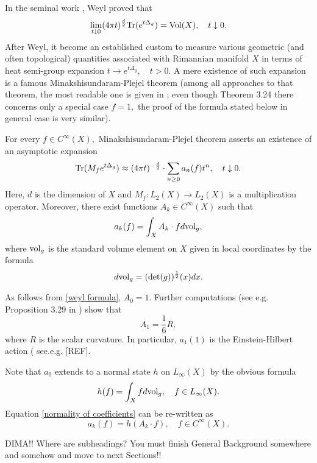 \documentclass{article}
\begin{document}
In the seminal work \cite{Weyl}, Weyl proved that
\begin{equation}\label{weyl formula}
\lim_{t\downarrow0}(4\pi t)^{\frac{d}{2}}{\rm Tr}(e^{t\Delta_g})={\rm Vol}(X),\quad t\downarrow0.
\end{equation}
After Weyl, it become an established custom to measure various geometric (and often topological) quantities associated with Rimannian manifold $X$ in terms of heat semi-group expansion $t\to e^{t\Delta_g},\quad t>0.$ A mere existence of such expansion is a famous Minakshisundaram-Plejel theorem (among all approaches to {\color{red} that} theorem, the most readable one is given in \cite{Rosenberg}; even though Theorem 3.24 there concerns only a special case $f=1,$ the proof of the formula stated below in general case is very similar). 

For every $f\in C^{\infty}(X),$ Minakshisundaram-Plejel theorem asserts an existence of an asymptotic expansion 
\begin{equation}\label{heat asymptotic}
{\rm Tr}(M_fe^{t\Delta_g})\approx (4\pi t)^{-\frac{d}{2}}\cdot \sum_{n\geq0}a_n(f)t^n,\quad t\downarrow0.
\end{equation}
Here, $d$ is the dimension of $X$ and $M_f:L_2(X)\to L_2(X)$ is a multiplication operator. Moreover, there exist functions $A_k\in C^{\infty}(X)$ such that
\begin{equation}\label{normality of coefficients}
a_k(f)=\int_X A_k\cdot f d{\rm vol}_g,
\end{equation}
where ${\rm vol}_g$ is the standard volume element on $X$ given in local coordinates by the formula
$$d{\rm vol}_g=({\rm det}(g))^{\frac12}(x)dx.$$

As follows from \eqref{weyl formula}, $A_0=1.$ Further computations (see e.g. Proposition 3.29 in \cite{Rosenberg}) show that
$$A_1=\frac16 R,$$
where $R$ is the scalar curvature. In particular, $a_1(1)$ is the Einstein-Hilbert action {\color{red}( see.e.g. [REF]}.

Note that $a_0$ extends to a normal state $h$ on $L_{\infty}(X)$ by the obvious formula
$$h(f)=\int_X fd{\rm vol}_g,\quad f\in L_{\infty}(X).$$
Equation \eqref{normality of coefficients} can be re-written as
$$a_k(f)=h(A_k\cdot f),\quad f\in C^{\infty}(X).$$

{\color{red} DIMA!! Where are subheadings? You must finish General Background somewhere and somehow and move to next Sections!!}
\end{document}
